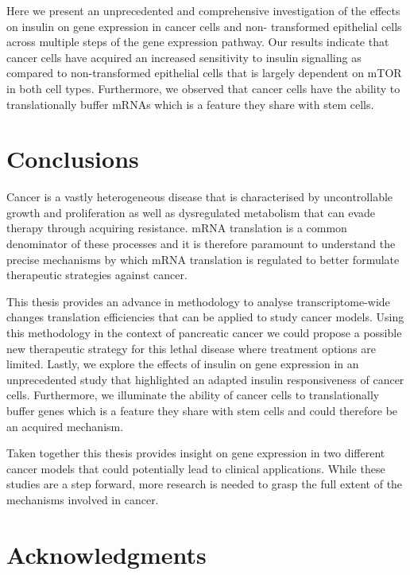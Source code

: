 \documentclass[12pt,openany]{book}
\begin{document}
Here we present an unprecedented and comprehensive investigation of the
effects on insulin on gene expression in cancer cells and non-
transformed epithelial cells across multiple steps of the gene
expression pathway. Our results indicate that cancer cells have acquired
an increased sensitivity to insulin signalling as compared to
non-transformed epithelial cells that is largely dependent on mTOR in
both cell types. Furthermore, we observed that cancer cells have the
ability to translationally buffer mRNAs which is a feature they share
with stem cells.

\chapter{Conclusions}

Cancer is a vastly heterogeneous disease that is characterised by
uncontrollable growth and proliferation as well as dysregulated
metabolism that can evade therapy through acquiring resistance. mRNA
translation is a common denominator of these processes and it is
therefore paramount to understand the precise mechanisms by which mRNA
translation is regulated to better formulate therapeutic strategies
against cancer.

This thesis provides an advance in methodology to analyse
transcriptome-wide changes translation efficiencies that can be applied
to study cancer models. Using this methodology in the context of
pancreatic cancer we could propose a possible new therapeutic strategy
for this lethal disease where treatment options are limited. Lastly, we
explore the effects of insulin on gene expression in an unprecedented
study that highlighted an adapted insulin responsiveness of cancer
cells. Furthermore, we illuminate the ability of cancer cells to
translationally buffer genes which is a feature they share with stem
cells and could therefore be an acquired mechanism.

Taken together this thesis provides insight on gene expression in two
different cancer models that could potentially lead to clinical
applications. While these studies are a step forward, more research is
needed to grasp the full extent of the mechanisms involved in cancer.

\chapter*{Acknowledgments}\label{acknowledgments}
\end{document}
